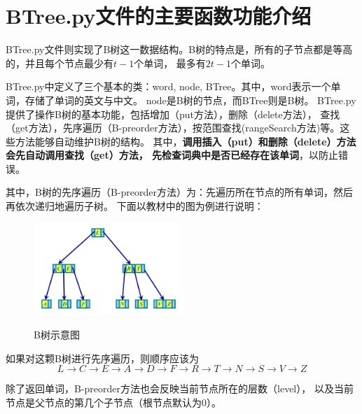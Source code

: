 \documentclass{article}
\begin{document}
\section{BTree.py文件的主要函数功能介绍}
BTree.py文件则实现了B树这一数据结构。B树的特点是，所有的子节点都是等高的，并且每个节点最少有$t-1$个单词，
最多有$2t-1$个单词。

BTree.py中定义了三个基本的类：word, node, BTree。其中，word表示一个单词，存储了单词的英文与中文。
node是B树的节点，而BTree则是B树。 BTree.py提供了操作B树的基本功能，包括增加（put方法），删除（delete方法），
查找（get方法），先序遍历（B-preorder方法），按范围查找(rangeSearch方法)等。这些方法能够自动维护B树的结构。
其中，\textbf{调用插入（put）和删除（delete）方法会先自动调用查找（get）方法，
先检查词典中是否已经存在该单词}，以防止错误。

其中，B树的先序遍历（B-preorder方法）为：先遍历所在节点的所有单词，然后再依次递归地遍历子树。
下面以教材中的图为例进行说明：
\begin{figure}[H]
	\centering
	{\includegraphics[width=0.5\textwidth]{image//先序遍历说明.jpg}}  
	\caption{B树示意图} \label{bt}
\end{figure}
如果对这颗B树进行先序遍历，则顺序应该为
\[L \rightarrow C \rightarrow E \rightarrow A \rightarrow D \rightarrow F \rightarrow  R \rightarrow  T \rightarrow N \rightarrow S \rightarrow V \rightarrow Z \]

除了返回单词，B-preorder方法也会反映当前节点所在的层数（level），
以及当前节点是父节点的第几个子节点（根节点默认为0）。
\end{document}

